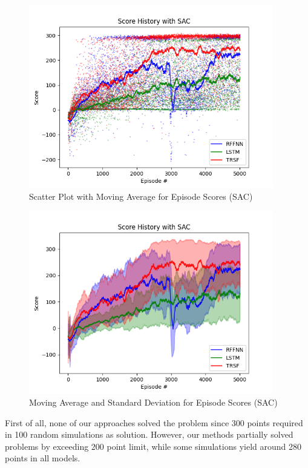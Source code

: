 \begin{figure}[!ht]
	\centering
	\includegraphics[width=0.95\textwidth]{figures/bipedal/SCATTER_SAC_RFFNN_LSTM_TRSF.png}
	\caption{Scatter Plot with Moving Average for Episode Scores (SAC)}
	\label{fig:sac_scatter_ep_rewards}
\end{figure}
\begin{figure}[!ht]
	\centering
	\includegraphics[width=0.95\textwidth]{figures/bipedal/STD_SAC_RFFNN_LSTM_TRSF.png}
	\caption{Moving Average and Standard Deviation for Episode Scores (SAC)}
	\label{fig:sac_std_ep_rewards}
\end{figure} 

First of all, none of our approaches solved the problem since 300 points required in 100 random simulations as solution. 
However, our methods partially solved problems by exceeding 200 point limit, while some simulations yield around 280 points in all models. 

